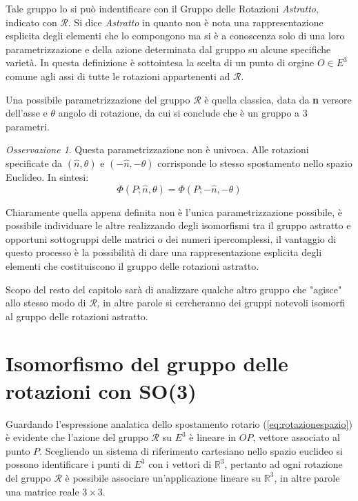 \documentclass[11pt]{report}
\theoremstyle{plain}
\theoremstyle{definition}
\theoremstyle{remark}
\newtheorem{oss}{Osservazione}
\begin{document}
Tale gruppo lo si può indentificare con il Gruppo delle Rotazioni \emph{Astratto}, indicato con $\mathscr{R}$.
Si dice \emph{Astratto} in quanto non è nota una rappresentazione esplicita degli elementi che lo compongono ma si è a conoscenza solo di una loro parametrizzazione e della azione determinata dal gruppo su alcune specifiche varietà. In questa definizione è sottointesa la scelta di un punto di orgine $O \in E^{3}$ comune agli assi di tutte le rotazioni appartenenti ad $\mathscr{R}$.

Una possibile parametrizzazione del gruppo $\mathscr{R}$ è quella classica, data da \textbf{n} versore dell'asse e $\theta$ angolo di rotazione, da cui si conclude che è un gruppo a 3 parametri.
\begin{oss}
Questa parametrizzazione non è univoca. Alle rotazioni specificate da $(\hat{n}, \theta)$ e $(-\hat{n}, -\theta)$ corrisponde lo stesso spostamento nello spazio Euclideo. In sintesi:
$$\Phi(P;\hat{n},\theta) = \Phi(P; -\hat{n}, -\theta) $$

\end{oss}

 Chiaramente quella appena definita non è l'unica  parametrizzazione possibile, è possibile individuare le altre realizzando degli isomorfismi tra il gruppo astratto e opportuni sottogruppi delle matrici o dei numeri ipercomplessi, il vantaggio di questo processo è la possibilità di dare una rappresentazione esplicita degli elementi che costituiscono il gruppo delle rotazioni astratto.

Scopo del resto del capitolo sarà di analizzare qualche altro gruppo che "agisce" allo stesso modo di $\mathscr{R}$, in altre parole si cercheranno dei gruppi notevoli isomorfi al gruppo delle rotazioni astratto.
\section{Isomorfismo del gruppo delle rotazioni con SO(3)}

Guardando l'espressione analatica dello spostamento rotario (\ref{eq:rotazionespazio}) è evidente che l'azione del gruppo $\mathscr{R}$ su $E^{3}$ è lineare in $OP$, vettore associato al punto $P$.
Scegliendo un sistema di riferimento cartesiano nello spazio euclideo si possono identificare i punti di $E^{3}$ con i vettori di $\mathbb{R}^{3}$, pertanto ad ogni rotazione del gruppo $\mathscr{R}$ è possibile associare un'applicazione lineare su $\mathbb{R}^{3}$, in altre parole una matrice reale $3 \times 3$.
\end{document}
